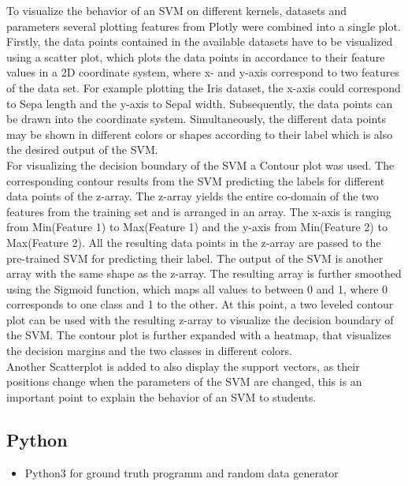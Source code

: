 \documentclass{scrartcl}
\begin{document}
To visualize the behavior of an SVM on different kernels, datasets and parameters several plotting features from Plotly were combined into a single plot. 
Firstly, the data points contained in the available datasets have to be visualized using a scatter plot, which plots the data points in accordance to their feature values in a 2D coordinate system, where x- and y-axis correspond to two features of the data set. 
For example plotting the Iris dataset, the x-axis could correspond to Sepa length and the y-axis to Sepal width. Subsequently, the data points can be drawn into the coordinate system. Simultaneously, the different data points may be shown in different colors or shapes according to their label which is also the desired output of the SVM.\\

For visualizing the decision boundary of the SVM a Contour plot was used. The corresponding contour results from the SVM predicting the labels for different data points of the z-array. The z-array yields the entire co-domain of the two features from the training set and is arranged in an array. The x-axis is ranging from Min(Feature 1) to Max(Feature 1) and the y-axis from Min(Feature 2) to Max(Feature 2). All the resulting data points in the z-array are passed to the pre-trained SVM for predicting their label. The output of the SVM is another array with the same shape as the z-array. The resulting array is further smoothed using the Sigmoid function, which maps all values to between 0 and 1, where 0 corresponds to one class and 1 to the other. 
At this point, a two leveled contour plot can be used with the resulting z-array  to visualize the decision boundary of the SVM. The contour plot is further expanded with a heatmap, that visualizes the decision margins and the two classes in different colors.\\

Another Scatterplot is added to also display the support vectors, as their positions change when the parameters of the SVM are changed, this is an important point to explain the behavior of an SVM to students.\\


\subsection{Python}

\begin{itemize}
	\item Python3 for ground truth programm and random data generator
\end{itemize}
\end{document}
